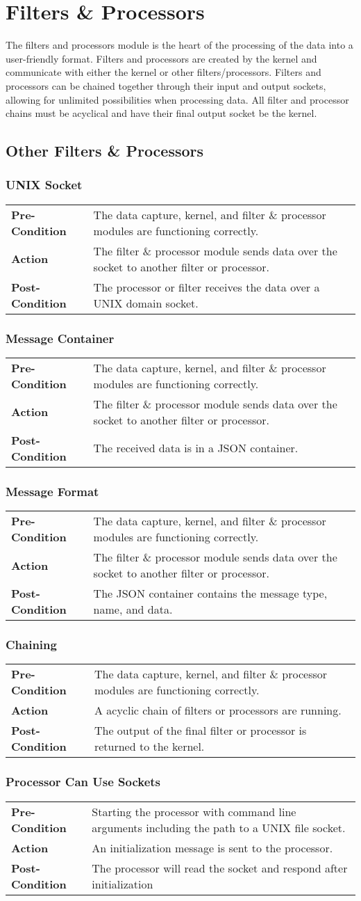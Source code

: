 \documentclass[titlepage]{article}
\newcommand{\testentry}[4]{
    \subsubsection{#1}
    \begin{center}
    \begin{tabular}{| l p{0.7\textwidth}|}
        \hline
        \bf Pre-Condition & #2 \\
        \bf Action & #3 \\
        \bf Post-Condition & #4 \\\hline
    \end{tabular}
    \end{center}
}
\begin{document}

\section{Filters \& Processors}
The filters and processors module is the heart of the processing of the data
into a user-friendly format.  Filters and processors are created by the kernel
and communicate with either the kernel or other filters/processors.
Filters and processors can be chained together through their input and output
sockets, allowing for unlimited possibilities when processing data.  All filter
and processor chains must be acyclical and have their final output socket be
the kernel.


\subsection{Other Filters \& Processors}

\testentry{UNIX Socket}
    {The data capture, kernel, and filter \& processor modules are functioning correctly.}
    {The filter \& processor module sends data over the socket to another filter or processor.}
    {The processor or filter receives the data over a UNIX domain socket.}

\testentry{Message Container}
    {The data capture, kernel, and filter \& processor modules are functioning correctly.}
    {The filter \& processor module sends data over the socket to another filter or processor.}
    {The received data is in a JSON container.}

\testentry{Message Format}
    {The data capture, kernel, and filter \& processor modules are functioning correctly.}
    {The filter \& processor module sends data over the socket to another filter or processor.}
    {The JSON container contains the message type, name, and data.}

\testentry{Chaining}
    {The data capture, kernel, and filter \& processor modules are functioning correctly.}
    {A acyclic chain of filters or processors are running.}
    {The output of the final filter or processor is returned to the kernel.}

\testentry{Processor Can Use Sockets}
    {Starting the processor with command line arguments including the path to a
        UNIX file socket.}
    {An initialization message is sent to the processor.}
    {The processor will read the socket and respond after initialization} 
\end{document}
